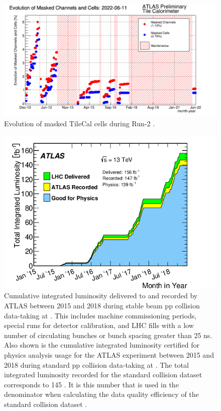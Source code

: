 		\begin{figure}
			\centering
			\includegraphics[width=.75\textwidth,keepaspectratio=true]{appendices/images/Masked_Cells_timeline_2022.png}
			\caption{\label{fig:tile-masked-cells} Evolution of masked \gls{TileCal} cells during Run-2 \cite{Tile-Run2-perf}.}
		\end{figure}

		\begin{figure}
			\centering
			\includegraphics[width=.75\textwidth,keepaspectratio=true]{appendices/images/ATLAS_DQ_lumi.png}
			\caption{\label{fig:dq-run2-lumi} Cumulative integrated luminosity delivered to and recorded by ATLAS between 2015 and 2018 during stable beam pp collision data-taking at \sqs. This includes machine commissioning periods, special runs for detector calibration, and LHC fills with a low number of circulating bunches or bunch spacing greater than 25 ns. Also shown is the cumulative integrated luminosity certified for physics analysis usage for the ATLAS experiment between 2015 and 2018 during standard pp collision data-taking at \sqs. The total integrated luminosity recorded for the standard \sqs \pp collision dataset corresponds to 145 \ifb. It is this number that is used in the denominator when calculating the data quality efficiency of the standard \sqs \pp collision dataset \cite{DQ-Run2}.}
		\end{figure}

